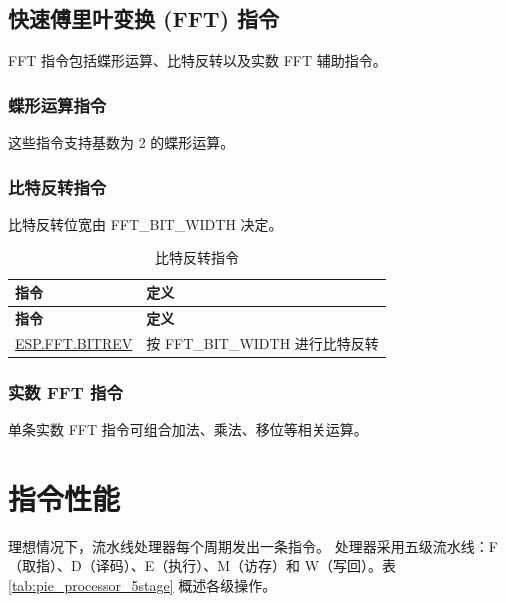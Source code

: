 \documentclass[main\_\_CN.tex]{subfiles}
\begin{document}


\subsection{快速傅里叶变换 (FFT) 指令}
\label{sec:pie-fft-instructions}

FFT 指令包括蝶形运算、比特反转以及实数 FFT 辅助指令。

\subsubsection{蝶形运算指令}

这些指令支持基数为 2 的蝶形运算。



\subsubsection{比特反转指令}

比特反转位宽由 FFT\_BIT\_WIDTH 决定。

\begin{longtable}[c]{|l|m{10cm}|}
    \caption{比特反转指令}
    \label{tab:pie-bitrev-instructions}\\
    \hline
    \rowcolor{lightgray}
    \textbf{指令} & \textbf{定义} \\\hline
    \endfirsthead
    \rowcolor{lightgray}
    \textbf{指令} & \textbf{定义} \\\hline
    \endhead
    \endfoot

    \hyperref[instruction:ESPFFTBITREV]{ESP.FFT.BITREV} & 按 FFT\_BIT\_WIDTH 进行比特反转
    \\\hline
\end{longtable}

\subsubsection{实数 FFT 指令}

单条实数 FFT 指令可组合加法、乘法、移位等相关运算。














\section{指令性能}\label{subsec:pie_pipeline}
理想情况下，流水线处理器每个周期发出一条指令。\chipname{} 处理器采用五级流水线：F（取指）、D（译码）、E（执行）、M（访存）和 W（写回）。表 \ref{tab:pie_processor_5stage} 概述各级操作。\\
\end{document}
